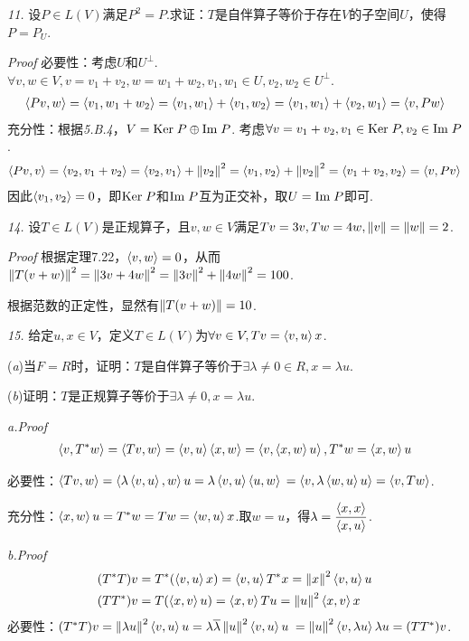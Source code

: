 \hspace*{\fill}

\textit{11.}
设\(P \in L(V)\)满足\(P^2=P\).求证：\(T\)是自伴算子等价于存在\(V\)的子空间\(U\)，使得\(P=P_U\).

\textit{Proof}
必要性：考虑\(U\)和\(U^\bot\).\(\forall v,w \in V,v=v_1+v_2,w=w_1+w_2,v_1,w_1 \in U,v_2,w_2 \in U^\bot\).
    \begin{align*}
        \ip{Pv}{w}=\ip{v_1}{w_1+w_2}=\ip{v_1}{w_1}+\ip{v_1}{w_2}=\ip{v_1}{w_1}+\ip{v_2}{w_1}=\ip{v}{Pw}
    \end{align*}
充分性：根据\textit{5.B.4}，\(V= \Ker P \oplus \Img P\).
考虑\(\forall v=v_1+v_2,v_1 \in \Ker P,v_2 \in \Img P\).
    \begin{align*}
        \ip{Pv}{v}=\ip{v_2}{v_1+v_2}=\ip{v_2}{v_1}+\norm{v_2}^2
        =\ip{v_1}{v_2}+\norm{v_2}^2=\ip{v_1+v_2}{v_2}=\ip{v}{Pv}
    \end{align*}
因此\(\ip{v_1}{v_2}=0\)，即\(\Ker P\)和\(\Img P\)互为正交补，取\(U=\Img P\)即可.

\newpage

\textit{14.}
设\(T \in L(V)\)是正规算子，且\(v,w \in V\)满足\(Tv=3v,Tw=4w,\norm{v}=\norm{w}=2\).

\textit{Proof}
根据定理7.22，\(\ip{v}{w}=0\)，从而\(\norm{T(v+w)}^2=\norm{3v+4w}^2=\norm{3v}^2+\norm{4w}^2=100\).

根据范数的正定性，显然有\(\norm{T(v+w)}=10\).

\hspace*{\fill}

\textit{15.}
给定\(u,x \in V\)，定义\(T \in L(V)\)为\(\forall v \in V,Tv=\ip{v}{u}x\).

(\textit{a})当\(F=R\)时，证明：\(T\)是自伴算子等价于\(\exists \lambda \ne 0 \in R,x=\lambda u\).

(\textit{b})证明：\(T\)是正规算子等价于\(\exists \lambda \ne 0,x=\lambda u\).

\textit{a.Proof}
    \begin{align*}
        \ip{v}{T^*w}=\ip{Tv}{w}=\ip{v}{u}\ip{x}{w}=\ip{v}{\ip{x}{w}u},T^*w=\ip{x}{w}u
    \end{align*}

必要性：\(\ip{Tv}{w}=\ip{\lambda \ip{v}{u}}{w}u=\lambda \ip{v}{u} \ip{u}{w}\)
\(=\ip{v}{\lambda \ip{w}{u}u}=\ip{v}{Tw}\).

充分性：\(\ip{x}{w}u=T^*w=Tw=\ip{w}{u}x\).取\(w=u\)，得\(\lambda=\dfrac{\ip{x}{x}}{\ip{x}{u}}\).

\textit{b.Proof}
    \begin{align*}
        &(T^*T)v=T^*(\ip{v}{u}x)=\ip{v}{u}T^*x=\norm{x}^2\ip{v}{u}u \\
        &(TT^*)v=T(\ip{x}{v}u)=\ip{x}{v}Tu=\norm{u}^2\ip{x}{v}x
    \end{align*}
必要性：\((T^*T)v=\norm{\lambda u}^2 \ip{v}{u}u=\lambda \ol{\lambda} \norm{u}^2 \ip{v}{u}u\)
\(=\norm{u}^2 \ip{v}{\lambda u}\lambda u=(TT^*)v\).

